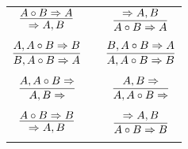 \documentclass[11pt]{article}
\begin{document}
\begin{center}
\begin{tabular}{ccc}
$\infer{\Rightarrow A, B}{A\circ B\Rightarrow A}$ && $\infer{A\circ B\Rightarrow A}{\Rightarrow A, B}$ \\
&& \\
$\infer{B, A\circ B\Rightarrow A}{A, A\circ B\Rightarrow B}$ && $\infer{A, A\circ B\Rightarrow B}{B, A\circ B\Rightarrow A}$ \\
&& \\
$\infer{A, B\Rightarrow }{A, A\circ B\Rightarrow }$ && $\infer{A, A\circ B\Rightarrow }{A, B\Rightarrow }$ \\
&& \\
$\infer{\Rightarrow A, B}{A\circ B\Rightarrow B}$ && $\infer{A\circ B\Rightarrow B}{\Rightarrow A, B}$ \\
&& \\

\end{tabular}

\end{center}
\end{document}
